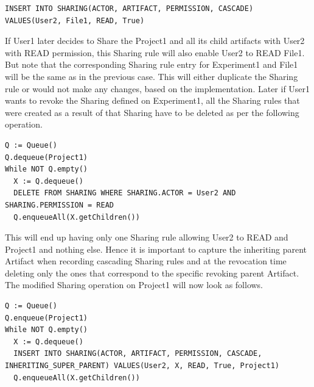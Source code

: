 \documentclass[sigconf]{acmart}
\begin{document}
\begin{lstlisting}
INSERT INTO SHARING(ACTOR, ARTIFACT, PERMISSION, CASCADE) VALUES(User2, File1, READ, True)
\end{lstlisting}

If User1 later decides to Share the Project1 and all its child artifacts with User2 with READ permission, this Sharing rule will also enable User2 to READ File1. But note that the corresponding Sharing rule entry for Experiment1 and File1 will be the same as in the previous case. This will either duplicate the Sharing rule or would not make any changes, based on the implementation. Later if User1 wants to revoke the Sharing defined on Experiment1, all the Sharing rules that were created as a result of that Sharing have to be deleted as per the following operation.

\begin{lstlisting}
Q := Queue()
Q.dequeue(Project1)
While NOT Q.empty()
  X := Q.dequeue()
  DELETE FROM SHARING WHERE SHARING.ACTOR = User2 AND SHARING.PERMISSION = READ
  Q.enqueueAll(X.getChildren())
\end{lstlisting}

This will end up having only one Sharing rule allowing User2 to READ and Project1 and nothing else. Hence it is important to capture the inheriting parent Artifact when recording cascading Sharing rules and at the revocation time deleting only the ones that correspond to the specific revoking parent Artifact. The modified Sharing operation on Project1 will now look as follows.

\begin{lstlisting}
Q := Queue()
Q.enqueue(Project1)
While NOT Q.empty()
  X := Q.dequeue()
  INSERT INTO SHARING(ACTOR, ARTIFACT, PERMISSION, CASCADE, INHERITING_SUPER_PARENT) VALUES(User2, X, READ, True, Project1)
  Q.enqueueAll(X.getChildren())
\end{lstlisting}
\end{document}
